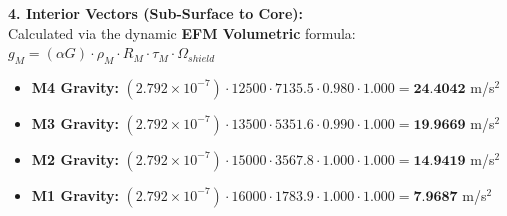 \documentclass[11pt, a4paper]{article}
\begin{document}
  \vspace{0.5em}
  \noindent \textbf{4. Interior Vectors (Sub-Surface to Core):} \\[0.5em]
  \hspace*{1em} Calculated via the dynamic \textbf{EFM Volumetric} formula: $g_M = (\alpha G) \cdot \rho_{M} \cdot R_M \cdot \tau_M \cdot \Omega_{shield}$
  \begin{itemize}
    \item \textbf{M4 Gravity:} $(2.792 \times 10^{-7}) \cdot 12500 \cdot 7135.5 \cdot 0.980 \cdot 1.000 = \textbf{24.4042}$ m/s$^2$
    \item \textbf{M3 Gravity:} $(2.792 \times 10^{-7}) \cdot 13500 \cdot 5351.6 \cdot 0.990 \cdot 1.000 = \textbf{19.9669}$ m/s$^2$
    \item \textbf{M2 Gravity:} $(2.792 \times 10^{-7}) \cdot 15000 \cdot 3567.8 \cdot 1.000 \cdot 1.000 = \textbf{14.9419}$ m/s$^2$
    \item \textbf{M1 Gravity:} $(2.792 \times 10^{-7}) \cdot 16000 \cdot 1783.9 \cdot 1.000 \cdot 1.000 = \textbf{7.9687}$ m/s$^2$
  \end{itemize}
\end{document}
